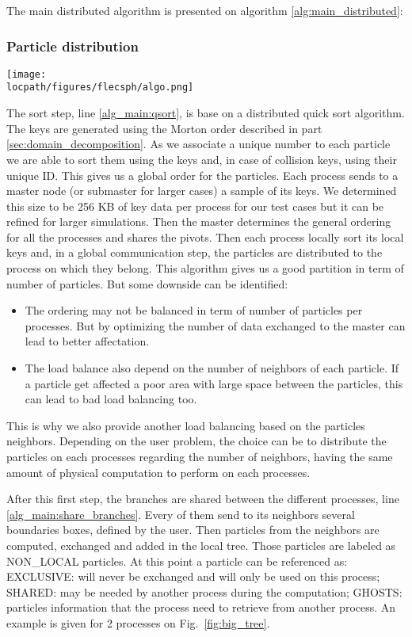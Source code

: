 The main distributed algorithm is presented on algorithm \ref{alg:main_distributed}:

\subsubsection{Particle distribution}

\begin{figure*}
\centering
\texttt{[image: \\locpath/figures/flecsph/algo.png]}
\caption{Binaries tree for a 2 processes system. Exclusive, Shared and Ghosts particles resp. red, blue, green.}
\label{fig:big_tree}
\end{figure*}

The sort step, line \ref{alg_main:qsort}, is base on a distributed quick sort algorithm. 
The keys are generated using the Morton order described in part \ref{sec:domain_decomposition}. 
As we associate a unique number to each particle we are able to sort them using the keys and, in case of collision keys, using their unique ID. 
This gives us a global order for the particles. 
Each process sends to a master node (or submaster for larger cases) a sample of its keys. 
We determined this size to be 256 KB of key data per process for our test cases but it can be refined for larger simulations. 
Then the master determines the general ordering for all the processes and shares the pivots. 
Then each process locally sort its local keys and, in a global communication step, the particles are distributed to the process on which they belong. 
This algorithm gives us a good partition in term of number of particles. 
But some downside can be identified:
\begin{itemize}
	\item The ordering may not be balanced in term of number of particles per processes. But by optimizing the number of data exchanged to the master can lead to better affectation. 
	\item The load balance also depend on the number of neighbors of each particle. If a particle get affected a poor area with large space between the particles, this can lead to bad load balancing too. 
\end{itemize}
This is why we also provide another load balancing based on the particles neighbors. 
Depending on the user problem, the choice can be to distribute the particles on each processes regarding the number of neighbors, having the same amount of physical computation to perform on each processes. 

After this first step, the branches are shared between the different processes, line \ref{alg_main:share_branches}. 
Every of them send to its neighbors several boundaries boxes, defined by the user. 
Then particles from the neighbors are computed, exchanged and added in the local tree. 
Those particles are labeled as NON\_LOCAL particles. 
At this point a particle can be referenced as: EXCLUSIVE: will never be exchanged and will only be used on this process; SHARED: may be needed by another process during the computation; GHOSTS: particles information that the process need to retrieve from another process. 
An example is given for 2 processes on Fig.~\ref{fig:big_tree}.

